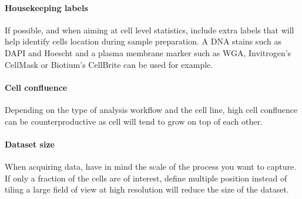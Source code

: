 \paragraph{Housekeeping labels} If possible, and when aiming at cell level statistics, include extra labels that will help identify cells location during sample preparation. A DNA stains such as DAPI and Hoescht and a plasma membrane marker such as WGA, Invitrogen's CellMask or Biotium's CellBrite can be used for example. 

\paragraph{Cell confluence} Depending on the type of analysis workflow and the cell line, high cell confluence can be counterproductive as cell will tend to grow on top of each other.

\paragraph{Dataset size} When acquiring data, have in mind the scale of the process you want to capture. If only a fraction of the cells are of interest, define multiple position instead of tiling a large field of view at high resolution will reduce the size of the dataset.





